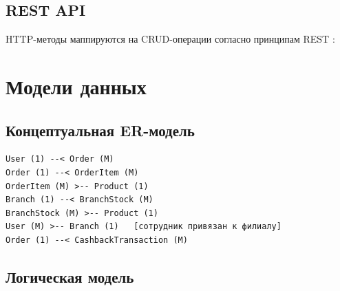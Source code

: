 \documentclass[14pt,a4paper]{extreport}
\begin{document}
\subsection{REST API}

HTTP-методы маппируются на CRUD-операции согласно принципам REST \cite{fielding2000}:

\begin{table}[h!]
\centering
\caption{Маппинг HTTP-методов}
\end{table}

\section{Модели данных}

\subsection{Концептуальная ER-модель}

\begin{lstlisting}[language={},caption={Основные связи между сущностями}]
User (1) --< Order (M)
Order (1) --< OrderItem (M)
OrderItem (M) >-- Product (1)
Branch (1) --< BranchStock (M)
BranchStock (M) >-- Product (1)
User (M) >-- Branch (1)   [сотрудник привязан к филиалу]
Order (1) --< CashbackTransaction (M)
\end{lstlisting}

\subsection{Логическая модель}
\end{document}
